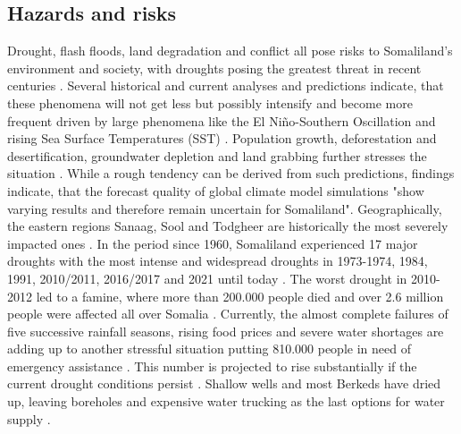 {%

\subsection{Hazards and risks}

Drought, flash floods, land degradation and conflict all pose risks to Somaliland's environment and society, with droughts posing the greatest threat in recent centuries \autocite{abdulkadirAssessmentDroughtRecurrence2017}. Several historical and current analyses and predictions indicate, that these phenomena will not get less but possibly intensify and become more frequent driven by large phenomena like the El Niño-Southern Oscillation and rising Sea Surface Temperatures (SST) \autocite{abdulkadirAssessmentDroughtRecurrence2017,aliMitigatingNaturalDisasters2017a, balintMonitoringDroughtCombined2013, erianGARSpecialReport2021, FAOSWALIMSomalia, museiSPEIbasedSpatialTemporal2021, nationaldroughtcommitteeSOMALILANDDROUGHTRAPID2022,trisosAfrica2022}. Population growth, deforestation and desertification, groundwater depletion and land grabbing further stresses the situation \autocite{aliMitigatingNaturalDisasters2017a}. While a rough tendency can be derived from such predictions, \autocite[10]{abdulkadirAssessmentDroughtRecurrence2017} findings indicate, that the forecast quality of global climate model simulations "show varying results and therefore remain uncertain for Somaliland". 
Geographically, the eastern regions Sanaag, Sool and Todgheer are historically the most severely impacted ones \autocite{abdulkadirAssessmentDroughtRecurrence2017, FAOSWALIMSomalia}. In the period since 1960, Somaliland experienced 17 major droughts with the most intense and widespread droughts in 1973-1974, 1984, 1991, 2010/2011, 2016/2017 and 2021 until today \autocite{abdulkadirAssessmentDroughtRecurrence2017, credEMDATInternationalDisasters2023}. The worst drought in 2010-2012 led to a famine, where more than 200.000 people died and over 2.6 million people were affected all over Somalia \autocite{srcsDRMStrategicPlan2021}.
Currently, the almost complete failures of five successive rainfall seasons, rising food prices and severe water shortages are adding up to another stressful situation putting 810.000 people in need of emergency assistance \autocite{nationaldroughtcommitteeSOMALILANDDROUGHTRAPID2022}. This number is projected to rise substantially if the current drought conditions persist \autocite{swansonNearlyMillionPeople2022}. Shallow wells and most Berkeds have dried up, leaving boreholes and expensive water trucking as the last options for water supply \autocite{nationaldroughtcommitteeSOMALILANDDROUGHTRAPID2022}.
}
